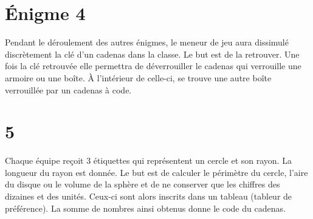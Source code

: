 \documentclass[parskip=half-]{scrartcl}
\begin{document}
\section*{Énigme 4}
Pendant le déroulement des autres énigmes, le meneur de jeu aura dissimulé discrètement la clé d'un cadenas dans la classe. Le but est de la retrouver. Une fois la clé retrouvée elle permettra de déverrouiller le cadenas qui verrouille une armoire ou une boîte. À l'intérieur de celle-ci, se trouve une autre boîte verrouillée par un cadenas à code.

\section*{5}
Chaque équipe reçoit 3 étiquettes qui représentent un cercle et son rayon. La longueur du rayon est donnée. Le but est de calculer le périmètre du cercle, l'aire du disque ou le volume de la sphère et de ne conserver que les chiffres des dizaines et des unités. Ceux-ci sont alors inscrits dans un tableau (tableur de préférence). La somme de nombres ainsi obtenus donne le code du cadenas.
\end{document}

